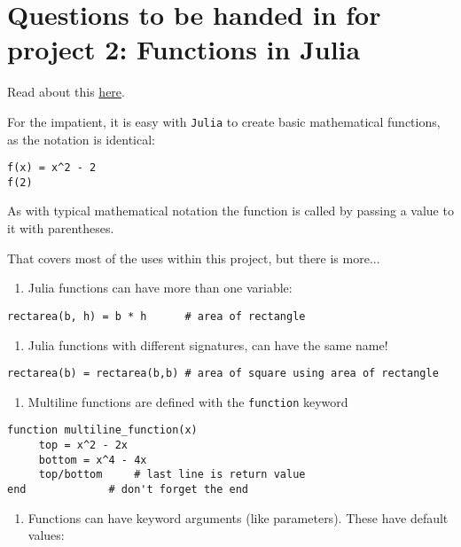 \documentclass[12pt]{article}
\begin{document}
\section{Questions to be handed in for project 2: Functions in Julia}

Read about this \href{http://mth229.github.io/functions.html}{here}.

For the impatient, it is easy with \texttt{Julia} to create basic
mathematical functions, as the notation is identical:



\begin{verbatim}
f(x) = x^2 - 2
f(2)
\end{verbatim}
As with typical mathematical notation the function is called by passing
a value to it with parentheses.

That covers most of the uses within this project, but there is more...

\begin{enumerate}
\def\labelenumi{\arabic{enumi})}
\itemsep1pt\parskip0pt
\item
  Julia functions can have more than one variable:
\end{enumerate}



\begin{verbatim}
rectarea(b, h) = b * h      # area of rectangle
\end{verbatim}
\begin{enumerate}
\def\labelenumi{\arabic{enumi})}
\setcounter{enumi}{1}
\itemsep1pt\parskip0pt
\item
  Julia functions with different signatures, can have the same name!
\end{enumerate}



\begin{verbatim}
rectarea(b) = rectarea(b,b) # area of square using area of rectangle
\end{verbatim}
\begin{enumerate}
\def\labelenumi{\arabic{enumi})}
\setcounter{enumi}{2}
\itemsep1pt\parskip0pt
\item
  Multiline functions are defined with the \texttt{function} keyword
\end{enumerate}



\begin{verbatim}
function multiline_function(x)
     top = x^2 - 2x
     bottom = x^4 - 4x
     top/bottom     # last line is return value
end             # don't forget the end
\end{verbatim}
\begin{enumerate}
\def\labelenumi{\arabic{enumi})}
\setcounter{enumi}{3}
\itemsep1pt\parskip0pt
\item
  Functions can have keyword arguments (like parameters). These have
  default values:
\end{enumerate}
\end{document}
